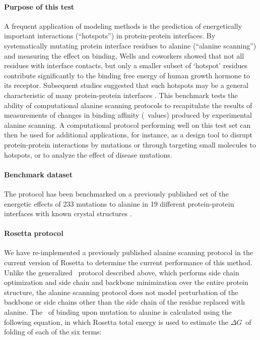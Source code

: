 \paragraph{Purpose of this test}

A frequent application of modeling methods is the prediction of energetically important interactions (``hotspots'') in protein-protein interfaces. By systematically mutating protein interface residues to alanine (``alanine scanning'') and measuring the effect on binding, Wells and coworkers \cite{clackson_hot_1995} showed that not all residues with interface contacts, but only a smaller subset of ‘hotspot’ residues contribute significantly to the binding free energy of human growth hormone to its receptor. Subsequent studies suggested that such hotspots may be a general characteristic of many protein-protein interfaces \cite{bogan_anatomy_1998,darnell_kfc_2008,zhu_kfc2:_2011}. This benchmark tests the ability of computational alanine scanning protocols to recapitulate the results of measurements of changes in binding affinity (\ddg\ values) produced by experimental alanine scanning. A computational protocol performing well on this test set can then be used for additional applications, for instance, as a design tool to disrupt protein-protein interactions by mutations or through targeting small molecules to hotspots, or to analyze the effect of disease mutations.

\paragraph{Benchmark dataset}

The protocol has been benchmarked on a previously published set of the energetic effects of 233 mutations to alanine in 19 different protein-protein interfaces with known crystal structures \cite{kortemme_simple_2002}.

\paragraph{Rosetta protocol}

We have re-implemented a previously published alanine scanning protocol \cite{kortemme_simple_2002,kortemme_computational_2004} in the current version of Rosetta to determine the current performance of this method. Unlike the generalized \ddg\ protocol described above, which performs side chain optimization and side chain and backbone minimization over the entire protein structure, the alanine scanning protocol does not model perturbation of the backbone or side chains other than the side chain of the residue replaced with alanine.
The \ddg\ of binding upon mutation to alanine is calculated using the following equation, in which Rosetta total energy is used to estimate the $\Delta G$\ of folding of each of the six terms:




